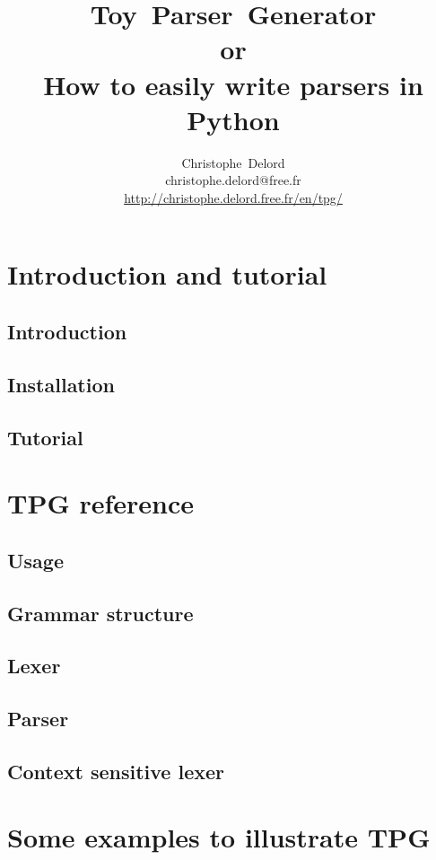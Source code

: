 \documentclass[a4paper,twoside]{report}
\author{
	Christophe~Delord \\
	christophe.delord@free.fr \\
	\url{http://christophe.delord.free.fr/en/tpg/} \\
}
\title{
	Toy~Parser~Generator \\
	or\\
	How to easily write parsers in Python \\
}
\begin{document}
\maketitle
\tableofcontents

\listoffigures

\cleardoublepage
\part{Introduction and tutorial}							\label{tpg:intro}
	\chapter{Introduction}
		
	\chapter{Installation}
		
	\chapter{Tutorial}										\label{tpg:tutorial}
		

\cleardoublepage
\part{TPG reference}										\label{tpg:core}
	\chapter{Usage}
		
	\chapter{Grammar structure}
		
	\chapter{Lexer}
		
	\chapter{Parser}
		
	\chapter{Context sensitive lexer}						\label{tpg:CSL}
		

\cleardoublepage
\part{Some examples to illustrate TPG}						\label{tpg:examples}
\end{document}
